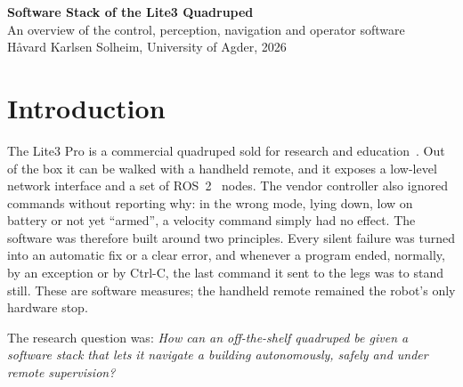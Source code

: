 \documentclass[11pt,a4paper]{article}
\begin{document}
\begin{center}
  {\LARGE\bfseries Software Stack of the Lite3 Quadruped}\\[0.4em]
  {\large An overview of the control, perception, navigation and operator software}\\[0.8em]
  Håvard Karlsen Solheim, University of Agder, 2026
\end{center}
\begin{abstract}
\noindent This report presents the software stack that was implemented for a DEEP Robotics Lite3 Pro
quadruped, with the aim of letting the robot walk autonomously around a university campus while being
supervised from a desk. The stack was distributed over three on-board computers: the vendor's motion
computer, a perception computer running the Robot Operating System 2 (ROS~2) and the robot's
programming interface, and an added Orin Nano running the lidar, lidar-inertial odometry, map
localization, navigation and speech. At its core was the \texttt{Lite3} Python class, which turned the
robot's silent failure modes into automatic fixes or explicit errors and ended every motion with a stop
command. In tests, the robot reached all of its navigation goals in the lab, the surrounding hall and
across a bridge to the campus arcade, with a person carrying the handheld remote nearby.
\end{abstract}

\section{Introduction}

The Lite3 Pro is a commercial quadruped sold for research and education~\cite{deeprobotics}. Out of the
box it can be walked with a handheld remote, and it exposes a low-level network interface and a set of
ROS~2~\cite{ros2} nodes. The vendor controller also ignored commands without reporting why: in the wrong mode, lying
down, low on battery or not yet ``armed'', a velocity command simply had no effect. The software was
therefore built around two principles. Every silent failure was turned into an automatic fix or a clear
error, and whenever a program ended, normally, by an exception or by Ctrl-C, the last command it sent
to the legs was to stand still. These are
software measures; the handheld remote remained the robot's only hardware stop.

The research question was: \emph{How can an off-the-shelf quadruped be given a software stack that lets
it navigate a building autonomously, safely and under remote supervision?}
\end{document}
